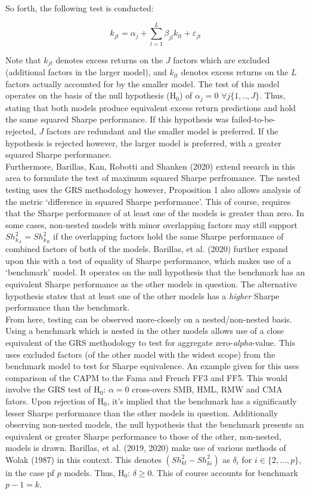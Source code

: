 \documentclass[11pt, english]{article}
\begin{document}
        So forth, the following test is conducted:

        $$k_{jt}=\alpha_j+\sum_{l=1}^L\beta_{jl}k_{lt}+\varepsilon_{jt}$$

        Note that $k_{jt}$ denotes excess returns on the $J$ factors which are excluded (additional factors in the larger model), and $k_{lt}$ denotes excess returns on the $L$ factors actually accounted for by the smaller model. The test of this model operates on the basis of the null hypothesis (H$_0$) of $\alpha_j=0$ $\forall j\{1,..,J\}$. Thus, stating that both models produce equivalent excess return predictions and hold the same squared Sharpe performance. If this hypothesis was failed-to-be-rejected, $J$ factors are redundant and the smaller model is preferred. If the hypothesis is rejected however, the larger model is preferred, with a greater squared Sharpe performance.\\

        Furthermore, Barillas, Kan, Robotti and Shanken (2020) extend reearch in this area to formulate the test of maximum squared Sharpe perfromance. The nested testing uses the GRS methodology however, Proposition 1 also allows analysis of the metric `difference in squared Sharpe performance'. This of course, requires that the Sharpe performance of at least one of the models is greater than zero. In some cases, non-nested models with minor overlapping factors may still support $Sh_{k_{A}}^2=Sh_{k_{B}}^2$ if the overlapping factors hold the same Sharpe performance of combined factors of both of the models. Barillas, et al. (2020) further expand upon this with a test of equality of Sharpe performance, which makes use of a `benchmark' model. It operates on the null hypothesis that the benchmark has an equivalent Sharpe performance as the other models in question. The alternative hypothesis states that at least one of the other models has a \textit{higher} Sharpe performance than the benchmark.\\

        From here, testing can be observed more-closely on a nested/non-nested basis. Using a benchmark which is nested in the other models allows use of a close equivalent of the GRS methodology to test for aggregate zero-\textit{alpha}-value. This uses excluded factors (of the other model with the widest scope) from the benchmark model to test for Sharpe equivalence. An example given for this uses comparison of the CAPM to the Fama and French FF3 and FF5. This would involve the GRS test of H$_0$: $\alpha=0$ cross-overs SMB, HML, RMW and CMA fators. Upon rejection of H$_0$, it's implied that the benchmark has a significantly lesser Sharpe performance than the other models in question. Additionally observing non-nested models, the null hypothesis that the benchmark presents an equivalent or greater Sharpe performance to those of the other, non-nested, models is drawn. Barillas, et al. (2019, 2020) make use of various methods of Wolak (1987) in this context. This denotes $(Sh_{kl}^2-Sh_{ki}^2)$ as $\delta_i$ for $i\in\{2,...,p\}$, in the case pf $p$ models. Thus, H$_0$: $\delta\geq 0$. This of course accounts for benchmark $p-1=k$.\\
\end{document}
